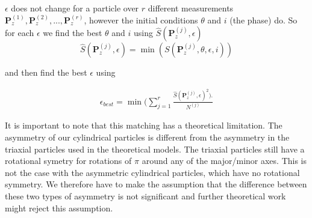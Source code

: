 \noindent $\epsilon$ does not change for a particle over $r$ different measurements $\mathbf{P}_z^{(1)}, \mathbf{P}_z^{(2)}, ..., \mathbf{P}_z^{(r)}$, however the initial conditions $\theta$ and $i$ (the phase) do. So for each $\epsilon$ we find the best $\theta$ and $i$ using $\hat{S}(\mathbf{P}^{(j)}_z, \epsilon)$ 
\begin{equation}
\hat{S}(\mathbf{P}^{(j)}_z, \epsilon) =  \min(S(\mathbf{P}^{(j)}_z, \theta, \epsilon, i)) 
\end{equation}

\noindent and  then find the best $\epsilon$ using

\begin{eqnarray}
\epsilon_{best} = \min(\sum\limits_{j=1}^{r} \frac{\hat{S}(\mathbf{P}^{(j)}_z, \epsilon)^2).}{N^{(j)}}
\end{eqnarray}


It is important to note that this matching has a theoretical limitation. The asymmetry of our cylindrical particles is different from the asymmetry in the triaxial particles used in the theoretical models. The triaxial particles still have a rotational symetry for rotations of $\pi$ around any of the major/minor axes. This is not the case with the asymmetric cylindrical particles, which have no rotational symmetry. We therefore have to make the assumption that the difference between these two types of asymmetry is not significant and further theoretical work might reject this assumption.

